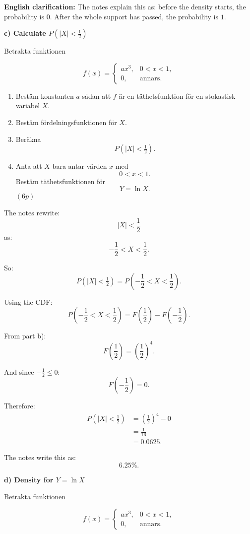 \documentclass[10pt]{article}
\begin{document}
\textbf{English clarification:}
The notes explain this as: before the density starts,
the probability is \(0\). After the whole support has
passed, the probability is \(1\).

\textbf{c) Calculate \(P(|X|<\frac12)\)}

Betrakta funktionen

\[
f(x)=
\begin{cases}
ax^3,
& 0<x<1,\\
0,
& \text{annars}.
\end{cases}
\]

\begin{enumerate}[label=\alph*)]
\item Bestäm konstanten \(a\) sådan att \(f\) är en
täthetsfunktion för en stokastisk variabel \(X\).

\item Bestäm fördelningsfunktionen för \(X\).

\item Beräkna
\[
P(|X|<\tfrac12).
\]

\item Anta att \(X\) bara antar värden \(x\) med
\[
0<x<1.
\]
Bestäm täthetsfunktionen för
\[
Y=\ln X.
\]
\((6p)\)
\end{enumerate}

The notes rewrite:
\[
|X|<\frac12
\]
as:
\[
-\frac12<X<\frac12.
\]

So:
\[
P(|X|<\tfrac12)
=
P\left(
-\frac12<X<\frac12
\right).
\]

Using the CDF:
\[
P\left(
-\frac12<X<\frac12
\right)
=
F\left(\frac12\right)
-
F\left(-\frac12\right).
\]

From part b):
\[
F\left(\frac12\right)
=
\left(\frac12\right)^4.
\]

And since \(-\frac12\le 0\):
\[
F\left(-\frac12\right)=0.
\]

Therefore:
\begin{align*}
P(|X|<\tfrac12)
&=
\left(\frac12\right)^4-0
\\[2mm]
&=
\frac{1}{16}
\\[2mm]
&=
0.0625.
\end{align*}

The notes write this as:
\[
6.25\%.
\]

\textbf{d) Density for \(Y=\ln X\)}

Betrakta funktionen

\[
f(x)=
\begin{cases}
ax^3,
& 0<x<1,\\
0,
& \text{annars}.
\end{cases}
\]
\end{document}
